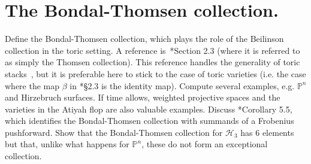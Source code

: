 \documentclass[11pt]{amsart}
\numberwithin{equation}{section}
\theoremstyle{definition}
\theoremstyle{remark}
\newcommand{\PP}{\mathbb P}
\newcommand{\QQ}{\mathbb Q}
\begin{document}
\section{The Bondal-Thomsen collection.}
Define the Bondal-Thomsen collection, which plays the role of the Beilinson collection in the toric setting. A reference is~\cite{HHL}*{Section 2.3} (where it is referred to as simply the Thomsen collection). This reference handles the generality of toric stacks~\cite{GS}, but it is preferable here to stick to the case of toric varieties (i.e. the case where the map $\beta$ in \cite{HHL}*{\S 2.3} is the identity map). Compute several examples, e.g. $\PP^n$ and Hirzebruch surfaces. If time allows, weighted projective spaces and the varieties in the Atiyah flop are also valuable examples. Discuss \cite{HHL}*{Corollary 5.5}, which identifies the Bondal-Thomsen collection with summands of a Frobenius pushforward. 
Show that the  Bondal-Thomsen collection for $\mathcal H_3$ has $6$ elements but that, unlike what happens for $\PP^n$, these do not form an exceptional collection.


\end{document}
